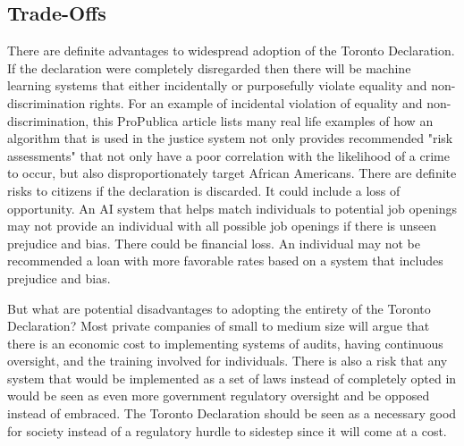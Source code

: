 \documentclass[
	letterpaper, %
]{jdf}
\begin{document}
\subsection{Trade-Offs}
There are definite advantages to widespread adoption of the Toronto Declaration. If the declaration were completely disregarded then there will be machine learning systems that either incidentally or purposefully violate equality and non-discrimination rights. For an example of incidental violation of equality and non-discrimination, this ProPublica article lists many real life examples of how an algorithm that is used in the justice system not only provides recommended "risk assessments" that not only have a poor correlation with the likelihood of a crime to occur, but also disproportionately target African Americans. There are definite risks to citizens if the declaration is discarded. It could include a loss of opportunity. An AI system that helps match individuals to potential job openings may not provide an individual with all possible job openings if there is unseen prejudice and bias. There could be financial loss. An individual may not be recommended a loan with more favorable rates based on a system that includes prejudice and bias.


But what are potential disadvantages to adopting the entirety of the Toronto Declaration? Most private companies of small to medium size will argue that there is an economic cost to implementing systems of audits, having continuous oversight, and the training involved for individuals. There is also a risk that any system that would be implemented as a set of laws instead of completely opted in would be seen as even more government regulatory oversight and be opposed instead of embraced. The Toronto Declaration should be seen as a necessary good for society instead of a regulatory hurdle to sidestep since it will come at a cost. 
\end{document}
